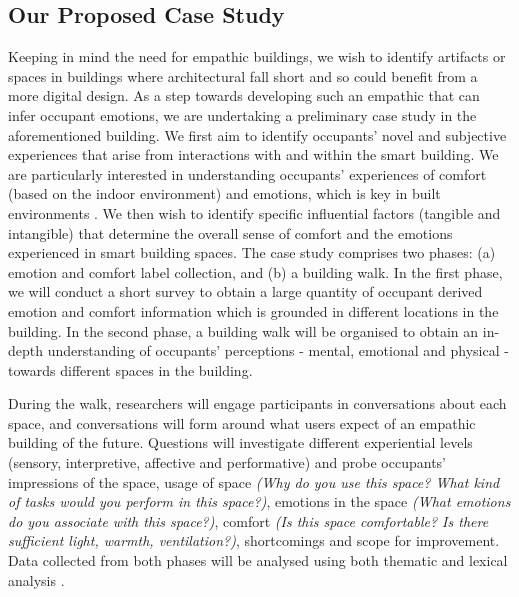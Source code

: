 \documentclass [sigconf, review, anonymous] {acmart}
\begin{document}
\subsection{Our Proposed Case Study} 
Keeping in mind the need for empathic buildings, we wish to identify artifacts or spaces in buildings where architectural  fall short and so could benefit from a more digital design. As a step towards developing such an empathic  that can infer occupant emotions, we are undertaking a preliminary case study in the aforementioned building. We first aim to identify occupants' novel and subjective experiences that arise from interactions with and within the smart building. We are particularly interested in understanding occupants' experiences of comfort (based on the indoor environment) and emotions, which is key in built environments \cite{alavi2017comfort}.  We then wish to identify specific influential factors (tangible and intangible) that determine the overall sense of comfort and the emotions experienced in smart building spaces. The case study comprises two phases: (a) emotion and comfort label collection, and (b) a building walk. In the first phase, we will conduct a short survey to obtain a large quantity of occupant derived emotion and comfort information which is grounded in different locations in the building. In the second phase, a building walk will be organised to obtain an in-depth understanding of occupants' perceptions - mental, emotional and physical - towards different spaces in the building.

During the walk, researchers will engage participants in conversations about each space, and conversations will form around what users expect of an empathic building of the future. Questions will investigate different experiential levels (sensory, interpretive, affective and performative) and probe occupants' impressions of the space, usage of space \textit{(Why do you use this space? What kind of tasks would you perform in this space?)}, emotions in the space \textit{(What emotions do you associate with this space?)}, comfort \textit{(Is this space comfortable? Is there sufficient light, warmth, ventilation?)}, shortcomings and scope for improvement.  Data collected from both phases will be analysed using both thematic and lexical analysis \cite{braun2006using, xue2020mood}. 
\end{document}
